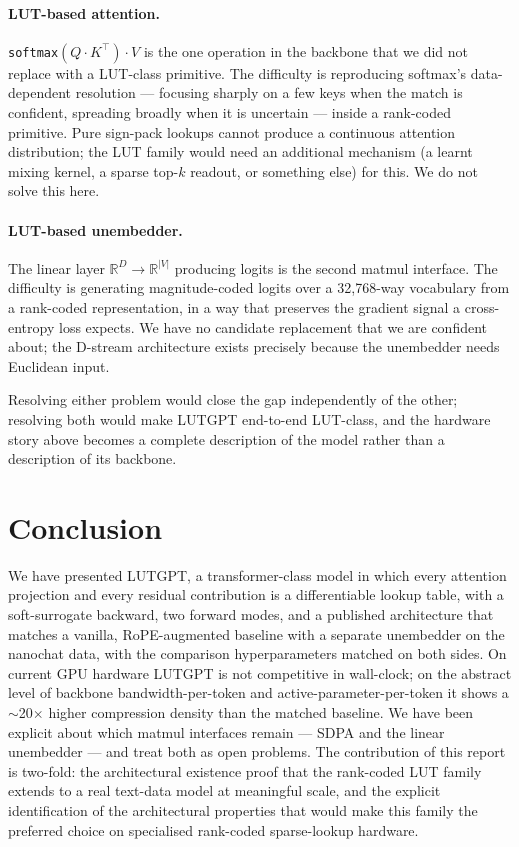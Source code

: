 \documentclass[11pt]{article}
\newcommand{\R}{\mathbb{R}}
\begin{document}
\paragraph{LUT-based attention.} \texttt{softmax}$(Q \cdot K^\top) \cdot V$ is the one operation in the backbone that we did not replace with a LUT-class primitive. The difficulty is reproducing softmax's data-dependent resolution --- focusing sharply on a few keys when the match is confident, spreading broadly when it is uncertain --- inside a rank-coded primitive. Pure sign-pack lookups cannot produce a continuous attention distribution; the LUT family would need an additional mechanism (a learnt mixing kernel, a sparse top-$k$ readout, or something else) for this. We do not solve this here.

\paragraph{LUT-based unembedder.} The linear layer $\R^D \to \R^{|V|}$ producing logits is the second matmul interface. The difficulty is generating magnitude-coded logits over a 32{,}768-way vocabulary from a rank-coded representation, in a way that preserves the gradient signal a cross-entropy loss expects. We have no candidate replacement that we are confident about; the D-stream architecture exists precisely because the unembedder needs Euclidean input.

Resolving either problem would close the gap independently of the other; resolving both would make LUTGPT end-to-end LUT-class, and the hardware story above becomes a complete description of the model rather than a description of its backbone.

\section{Conclusion}

We have presented LUTGPT, a transformer-class model in which every attention projection and every residual contribution is a differentiable lookup table, with a soft-surrogate backward, two forward modes, and a published architecture that matches a vanilla, RoPE-augmented baseline with a separate unembedder on the nanochat data, with the comparison hyperparameters matched on both sides. On current GPU hardware LUTGPT is not competitive in wall-clock; on the abstract level of backbone bandwidth-per-token and active-parameter-per-token it shows a $\sim$20$\times$ higher compression density than the matched baseline. We have been explicit about which matmul interfaces remain --- SDPA and the linear unembedder --- and treat both as open problems. The contribution of this report is two-fold: the architectural existence proof that the rank-coded LUT family extends to a real text-data model at meaningful scale, and the explicit identification of the architectural properties that would make this family the preferred choice on specialised rank-coded sparse-lookup hardware.
\end{document}
